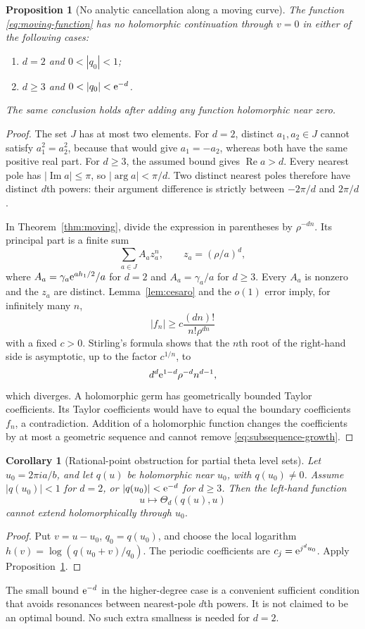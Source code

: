 \documentclass[11pt,a4paper]{article}
\numberwithin{equation}{section}
\newtheorem{proposition}[theorem]{Proposition}
\newtheorem{corollary}[theorem]{Corollary}
\theoremstyle{definition}\newtheorem{definition}[theorem]{Definition}
\theoremstyle{remark}\newtheorem{remark}[theorem]{Remark}
\theoremstyle{definition}
\newcommand{\Rea}{\operatorname{Re}}\newcommand{\Ima}{\operatorname{Im}}
\begin{document}
\begin{proposition}[No analytic cancellation along a moving curve]
\label{prop:no-cancellation}
The function \eqref{eq:moving-function} has no holomorphic continuation
through $v=0$ in either of the following cases:
\begin{enumerate}[label=(\roman*)]
\item $d=2$ and $0<|q_0|<1$;
\item $d\ge3$ and $0<|q_0|<\e^{-d}$.
\end{enumerate}
The same conclusion holds after adding any function holomorphic near zero.
\end{proposition}
\begin{proof}
The set $J$ has at most two elements. For $d=2$, distinct $a_1,a_2\in J$
cannot satisfy $a_1^2=a_2^2$, because that would give $a_1=-a_2$, whereas
both have the same positive real part. For $d\ge3$, the assumed bound gives
$\Rea a>d$. Every nearest pole has $|\Ima a|\le\pi$, so
$|\arg a|<\pi/d$. Two distinct nearest poles therefore have distinct $d$th
powers: their argument difference is strictly between $-2\pi/d$ and $2\pi/d$.

In Theorem~\ref{thm:moving}, divide the expression in parentheses by
$\rho^{-dn}$. Its principal part is a finite sum
\[
 \sum_{a\in J} A_a z_a^n,\qquad z_a=(\rho/a)^d,
\]
where $A_a=\gamma_a\mathrm e^{a h_1/2}/a$ for $d=2$ and
$A_a=\gamma_a/a$ for $d\ge3$. Every $A_a$ is nonzero and the $z_a$ are
distinct. Lemma~\ref{lem:cesaro} and the $o(1)$ error imply, for infinitely
many $n$,
\begin{equation}
 |f_n|\ge c\frac{(dn)!}{n!\rho^{dn}}
 \label{eq:subsequence-growth}
\end{equation}
with a fixed $c>0$. Stirling's formula shows that the $n$th root of the
right-hand side is asymptotic, up to the factor $c^{1/n}$, to
\[
 d^d\mathrm e^{1-d}\rho^{-d}n^{d-1},
\]
which diverges. A holomorphic germ has geometrically bounded Taylor
coefficients. Its Taylor coefficients would have to equal the boundary
coefficients $f_n$, a contradiction. Addition of a holomorphic function
changes the coefficients by at most a geometric sequence and cannot remove
\eqref{eq:subsequence-growth}.
\end{proof}

\begin{corollary}[Rational-point obstruction for partial theta level sets]
\label{cor:rational}
Let $u_0=2\pi i a/b$, and let $q(u)$ be holomorphic near $u_0$, with
$q(u_0)\ne0$. Assume $|q(u_0)|<1$ for $d=2$, or $|q(u_0)|<\mathrm e^{-d}$ for
$d\ge3$. Then the left-hand function
\[
 u\longmapsto\Theta_d(q(u),u)
\]
cannot extend holomorphically through $u_0$.
\end{corollary}
\begin{proof}
Put $v=u-u_0$, $q_0=q(u_0)$, and choose the local logarithm
$h(v)=\log(q(u_0+v)/q_0)$. The periodic coefficients are
$c_j=\mathrm e^{j^d u_0}$. Apply Proposition~\ref{prop:no-cancellation}.
\end{proof}
The small bound $\mathrm e^{-d}$ in the higher-degree case is a convenient sufficient
condition that avoids resonances between nearest-pole $d$th powers. It is not
claimed to be an optimal bound. No such extra smallness is needed for $d=2$.
\end{document}
